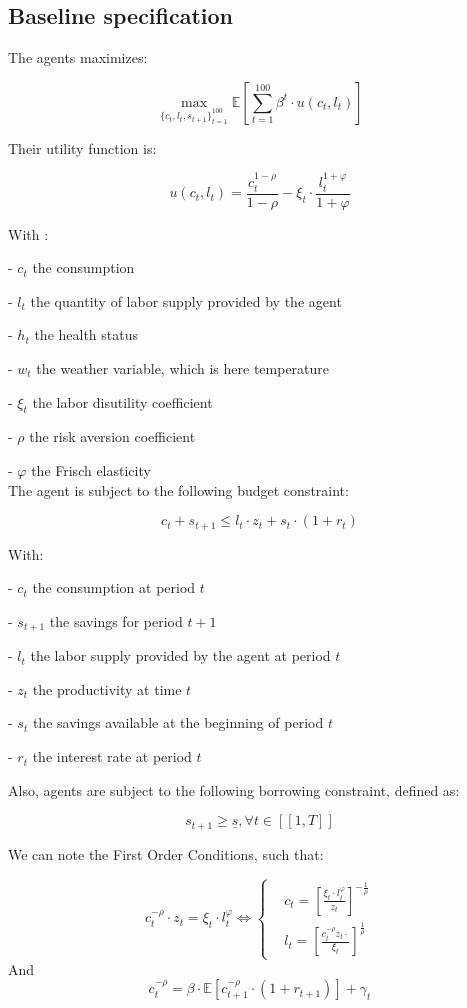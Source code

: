 \documentclass{article}
\begin{document}
\subsection{Baseline specification }

The agents maximizes: 

$$ \max_{\{c_{t},l_{t},s_{t+1}\}_{t=1}^{100}}{\mathbb{E}\left[\sum_{t=1}^{100} \beta^{t}\cdot u(c_t,l_t)\right]}$$

Their utility function is: 

$$u(c_{t},l_{t}) = \frac{c_{t}^{1-\rho}}{1-\rho}-\xi_{t}\cdot \frac{l_{t}^{1+\varphi}}{1+\varphi}$$

With : 

-  $c_{t}$  the consumption

-  $l_{t}$  the quantity of labor supply provided by the agent

-  $h_{t}$  the health status

-  $w_{t}$  the weather variable, which is here temperature

-  $\xi_{t}$ the labor disutility coefficient

- $\rho$ the risk aversion coefficient

- $\varphi$ the Frisch elasticity
\\

The agent is subject to the following budget constraint:

$$c_{t} + s_{t+1} \leq l_{t}\cdot z_{t} + s_{t}\cdot(1+r_{t})$$

With: 

-  $c_t$ the consumption at period $t$

-  $s_{t+1}$ the savings for period $t+1$

-  $l_t$ the labor supply provided by the agent at period $t$

-  $z_t$ the productivity at time $t$

-  $s_{t}$ the savings available at the beginning of period $t$

-  $r_{t}$ the interest rate at period $t$

Also, agents are subject to the following borrowing constraint, defined as: 

$$s_{t+1}\geq \underline{s}, \forall t \in [\![1,T]\!]$$


We can note the First Order Conditions, such that: 

\begin{equation}
    c^{-\rho}_{t}\cdot z_{t} = \xi_{t}\cdot l_{t}^{\varphi} \iff
        \begin{cases}
        & c_t = \left[\frac{\xi_{t}\cdot l_{t}^{\varphi}}{z_{t}}\right]^{-\frac{1}{\rho}}\\ 
        & l_{t} = \left[\frac{c_{t}^{-\rho}z_{t}\cdot}{\xi_{t}}\right]^{\frac{1}{\rho}}
    \end{cases}
\end{equation}
And 
\begin{equation}
    c^{-\rho}_{t} = \beta \cdot \mathbb{E}\left[c^{-\rho}_{t+1}\cdot (1+r_{t+1})\right] + \gamma_{t}
\end{equation}
\end{document}
